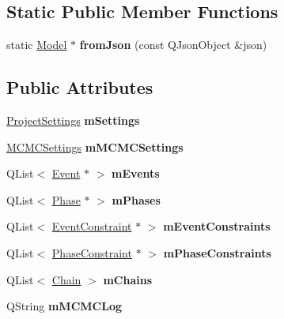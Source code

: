 \subsection*{Static Public Member Functions}
\begin{DoxyCompactItemize}
\item 
\hypertarget{class_model_ae5d3d80f7c7e3393bf134e69398ebfcc}{static \hyperlink{class_model}{Model} $\ast$ {\bfseries from\-Json} (const Q\-Json\-Object \&json)}\label{class_model_ae5d3d80f7c7e3393bf134e69398ebfcc}

\end{DoxyCompactItemize}
\subsection*{Public Attributes}
\begin{DoxyCompactItemize}
\item 
\hypertarget{class_model_aa0d7c530c61759b5ae356c79fb03b089}{\hyperlink{class_project_settings}{Project\-Settings} {\bfseries m\-Settings}}\label{class_model_aa0d7c530c61759b5ae356c79fb03b089}

\item 
\hypertarget{class_model_abc271343ea0b3a3b8980d7684ee639a4}{\hyperlink{class_m_c_m_c_settings}{M\-C\-M\-C\-Settings} {\bfseries m\-M\-C\-M\-C\-Settings}}\label{class_model_abc271343ea0b3a3b8980d7684ee639a4}

\item 
\hypertarget{class_model_aadd6921a4fd6219116d652a2f970c50c}{Q\-List$<$ \hyperlink{class_event}{Event} $\ast$ $>$ {\bfseries m\-Events}}\label{class_model_aadd6921a4fd6219116d652a2f970c50c}

\item 
\hypertarget{class_model_afd79363189994743dd3208ea05ef993b}{Q\-List$<$ \hyperlink{class_phase}{Phase} $\ast$ $>$ {\bfseries m\-Phases}}\label{class_model_afd79363189994743dd3208ea05ef993b}

\item 
\hypertarget{class_model_ab9e20b3c5faca2a1fd1a1f03e38fc2b7}{Q\-List$<$ \hyperlink{class_event_constraint}{Event\-Constraint} $\ast$ $>$ {\bfseries m\-Event\-Constraints}}\label{class_model_ab9e20b3c5faca2a1fd1a1f03e38fc2b7}

\item 
\hypertarget{class_model_a47ed19515b5c6839db0e88c7a6e42b60}{Q\-List$<$ \hyperlink{class_phase_constraint}{Phase\-Constraint} $\ast$ $>$ {\bfseries m\-Phase\-Constraints}}\label{class_model_a47ed19515b5c6839db0e88c7a6e42b60}

\item 
\hypertarget{class_model_a2c8934ed8e15ba9188c4452dc439a4af}{Q\-List$<$ \hyperlink{struct_chain}{Chain} $>$ {\bfseries m\-Chains}}\label{class_model_a2c8934ed8e15ba9188c4452dc439a4af}

\item 
\hypertarget{class_model_a9b0b8e35a7c1411acd18d7c011725429}{Q\-String {\bfseries m\-M\-C\-M\-C\-Log}}\label{class_model_a9b0b8e35a7c1411acd18d7c011725429}

\end{DoxyCompactItemize}


